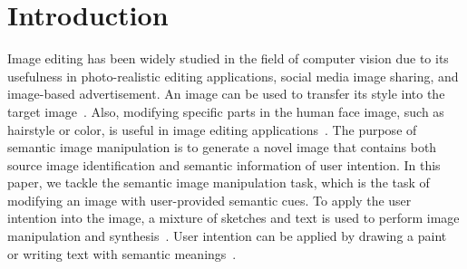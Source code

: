 \documentclass[10pt,twocolumn,letterpaper]{article}
\def\authornote#1#2#3{{\textcolor{#2}{\textsl{\small[#1: #3]}}}}
\newcommand{\wonmin}[1]{\authornote{Wonmin}{Blue}{#1}} %
\begin{document}
\section{Introduction}
\vspace{-0.5em}




Image editing has been widely studied in the field of computer vision due to 
its usefulness in photo-realistic editing applications, social media image sharing, and image-based advertisement.
An image can be used to transfer its style into the target image~\cite{gatys2016image, gatys2016neural}.
Also, modifying specific parts in the human face image, such as hairstyle or color, is useful in image editing applications~\cite{xia2021tedigan,Patashnik_2021_ICCV}.
The purpose of semantic image manipulation is to generate a novel image that contains both source image identification and semantic information of user intention. 
In this paper, we tackle the semantic image manipulation task, which is the task of modifying an image with user-provided semantic cues.
To apply the user intention into the image, a mixture of sketches and text is used to perform image manipulation and synthesis~\cite{park2019semantic,xia2021tedigan}.
User intention can be applied by drawing a paint~\cite{park2019semantic} or writing text with semantic meanings~\cite{xia2021tedigan,gatys2016neural}.
\iffalse 
TediGAN~\cite{xia2021tedigan} also gives extra-inputs to text-based image manipulation by embedding other modalities, such as mask and sketch, in the same space as text. More specifically, TediGAN projects the multi-modal embedding of the mask onto $\mathcal{W}$ Space of StyleGAN. 
Multi-modal image manipulation is performed by style mixing latent code obtained from content and text-driven latent code. However, extra inputs mainly support refining shape or boundary of objects in the image, and such objects are often predefined.
Also, non of these works have use sound directly to edit the image.
\fi
\end{document}
